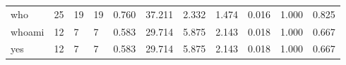 \begin{longtable}{lp{1.2cm}p{1.2cm}p{1.2cm}p{1.2cm}p{1.2cm}p{1.2cm}p{1.2cm}p{1.2cm}p{1.2cm}p{1.2cm}}
who       &                           25 &                 19 &                                19 &                                      0.760 &                                 37.211 &                                        2.332 &                             1.474 &                                   0.016 &                              1.000 &                                              0.825 \\
whoami    &                           12 &                  7 &                                 7 &                                      0.583 &                                 29.714 &                                        5.875 &                             2.143 &                                   0.018 &                              1.000 &                                              0.667 \\
yes       &                           12 &                  7 &                                 7 &                                      0.583 &                                 29.714 &                                        5.875 &                             2.143 &                                   0.018 &                              1.000 &                                              0.667 \\
\end{longtable}
